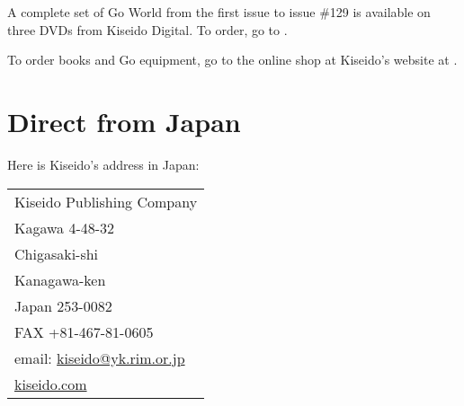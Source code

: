 A complete set of Go World from the first issue to issue \#129 is available on three DVDs from Kiseido Digital. To order, go to \href{https://www.kiseidodigital.com}{}.

To order books and Go equipment, go to the online shop at Kiseido's website at \href{https://www.kiseido.com}{}.

\section{Direct from Japan}

Here is Kiseido's address in Japan:

\bigskip
\bigskip

\begin{tabular}{l}
    \hline
    Kiseido Publishing Company \\
    Kagawa 4-48-32 \\
    Chigasaki-shi \\
    Kanagawa-ken \\
    Japan 253-0082 \\
    FAX +81-467-81-0605 \\
    email: \href{mailto:kiseido@yk.rim.or.jp}{kiseido@yk.rim.or.jp} \\
    \href{https://www.kiseido.com}{kiseido.com} \\
    \hline
\end{tabular}